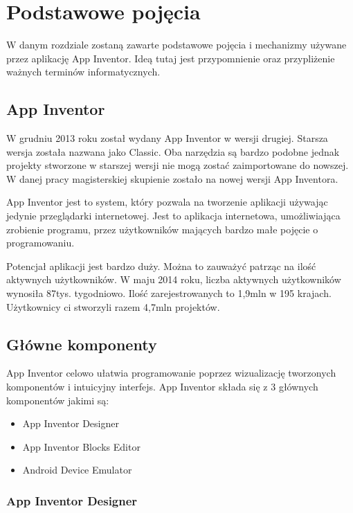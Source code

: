 \chapter{Podstawowe pojęcia}
\label{c2}

W danym rozdziale zostaną zawarte podstawowe pojęcia i mechanizmy używane przez aplikację App Inventor. Ideą tutaj jest przypomnienie oraz przypliżenie ważnych terminów informatycznych.

\section{App Inventor}
\label{c21}

W grudniu 2013 roku został wydany App Inventor w wersji drugiej. Starsza wersja została nazwana jako Classic. Oba narzędzia są bardzo podobne jednak projekty stworzone w starszej wersji nie mogą zostać zaimportowane do nowszej. W danej pracy magisterskiej skupienie zostało na nowej wersji App Inventora.

App Inventor jest to system, który pozwala na tworzenie aplikacji używając jedynie przeglądarki internetowej. Jest to aplikacja internetowa, umożliwiająca zrobienie programu, przez użytkowników mających bardzo małe pojęcie o programowaniu. 

Potencjał aplikacji jest bardzo duży. Można to zauważyć patrząc na ilość aktywnych użytkowników. W maju 2014 roku, liczba aktywnych użytkowników wynosiła 87tys. tygodniowo. Ilość zarejestrowanych to 1,9mln w 195 krajach. Użytkownicy ci stworzyli razem 4,7mln projektów.\cite{article:appinventor1}

\section{Główne komponenty}
\label{c22}

App Inventor celowo ułatwia programowanie poprzez wizualizację tworzonych komponentów i intuicyjny interfejs. App Inventor składa się z 3 głównych komponentów jakimi są:
\begin{itemize}
\item App Inventor Designer
\item App Inventor Blocks Editor
\item Android Device Emulator
\end{itemize}

\subsection{App Inventor Designer}
\label{c221}

